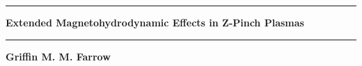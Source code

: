 \begin{titlepage}
		

			\begin{center}
				\vfill
				\Huge
				\rule{\linewidth}{2pt}
				\textbf{Extended Magnetohydrodynamic Effects in Z-Pinch Plasmas}
				\rule{\linewidth}{2pt}		
				\vfill
				\vspace{1cm}
				\Large
				\textbf{Griffin M. M. Farrow}

			\end{center}

\end{titlepage}